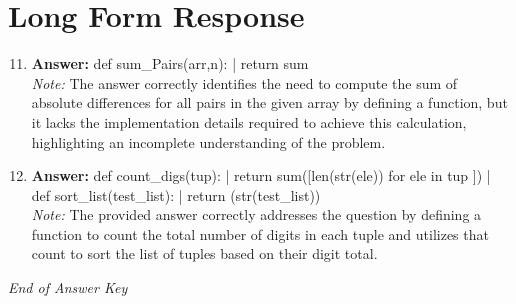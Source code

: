 \documentclass[12pt]{article}
\begin{document}
\section*{Long Form Response}
\begin{enumerate}[label=\arabic*.]
\setcounter{enumi}{10}
\item \textbf{Answer:} def sum\_Pairs(arr,n): | return sum
\\ \textit{Note:} The answer correctly identifies the need to compute the sum of absolute differences for all pairs in the given array by defining a function, but it lacks the implementation details required to achieve this calculation, highlighting an incomplete understanding of the problem.
\item \textbf{Answer:} def count\_digs(tup): | return sum([len(str(ele)) for ele in tup ]) | def sort\_list(test\_list): | return (str(test\_list))
\\ \textit{Note:} The provided answer correctly addresses the question by defining a function to count the total number of digits in each tuple and utilizes that count to sort the list of tuples based on their digit total.
\end{enumerate}

\vfill
\noindent\textit{End of Answer Key}
\end{document}
